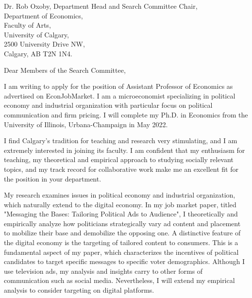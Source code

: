 \documentclass[12pt]{letter}
\begin{document}
\date{}
\begin{letter}{Dr. Rob Oxoby, Department Head and Search Committee Chair, \\
Department of Economics,\\
Faculty of Arts,\\
University of Calgary,\\
2500 University Drive NW,\\
Calgary, AB T2N 1N4.}

\opening{Dear Members of the Search Committee,}

I am writing to apply for the position of Assistant Professor of Economics as advertised on EconJobMarket.
I am a microeconomist specializing in political economy and industrial organization with particular focus on political communication and firm pricing.
I will complete my Ph.D. in Economics from the University of Illinois, Urbana-Champaign in May 2022. 

I find Calgary's tradition for teaching and research very stimulating, and 
I am extremely interested in joining its faculty.
%
I am confident that my enthusiasm for teaching, my theoretical and empirical approach to studying socially relevant topics, 
and my track record for collaborative work make me an excellent fit for the position in your department. 

My research examines issues in political economy and industrial organization, which naturally extend to the digital economy.
In my job market paper, titled "Messaging the Bases: Tailoring Political Ads to Audience", I theoretically and empirically analyze how politicians strategically vary ad content and placement to mobilize their base and demobilize the opposing one.
A distinctive feature of the digital economy is the targeting of tailored content to consumers.
This is a fundamental aspect of my paper, which characterizes the incentives of political candidates to target specific messages to specific voter demographics.
Although I use television ads, my analysis and insights carry to other forms of communication such as social media.
Nevertheless, I will extend my empirical analysis to consider targeting on digital platforms.


\end{letter}
\end{document}
